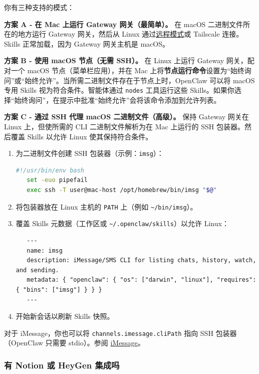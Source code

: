 你有三种支持的模式：

\textbf{方案 A - 在 Mac 上运行 Gateway 网关（最简单）。}
在 macOS 二进制文件所在的地方运行 Gateway 网关，然后从 Linux 通过\href{\#how-do-i-run-openclaw-in-remote-mode-client-connects-to-a-gateway-elsewhere}{远程模式}或 Tailscale 连接。Skills 正常加载，因为 Gateway 网关主机是 macOS。

\textbf{方案 B - 使用 macOS 节点（无需 SSH）。}
在 Linux 上运行 Gateway 网关，配对一个 macOS 节点（菜单栏应用），并在 Mac 上将\textbf{节点运行命令}设置为“始终询问”或“始终允许”。当所需二进制文件存在于节点上时，OpenClaw 可以将 macOS 专用 Skills 视为符合条件。智能体通过 \texttt{nodes} 工具运行这些 Skills。如果你选择“始终询问”，在提示中批准“始终允许”会将该命令添加到允许列表。

\textbf{方案 C - 通过 SSH 代理 macOS 二进制文件（高级）。}
保持 Gateway 网关在 Linux 上，但使所需的 CLI 二进制文件解析为在 Mac 上运行的 SSH 包装器。然后覆盖 Skills 以允许 Linux 使其保持符合条件。

\begin{enumerate}
  \item 为二进制文件创建 SSH 包装器（示例：\texttt{imsg}）：
\begin{lstlisting}[language=bash]
   #!/usr/bin/env bash
   set -euo pipefail
   exec ssh -T user@mac-host /opt/homebrew/bin/imsg "$@"
\end{lstlisting}

  \item 将包装器放在 Linux 主机的 \texttt{PATH} 上（例如 \texttt{\textasciitilde{}/bin/imsg}）。
  \item 覆盖 Skills 元数据（工作区或 \texttt{\textasciitilde{}/.openclaw/skills}）以允许 Linux：
\begin{lstlisting}
   ---
   name: imsg
   description: iMessage/SMS CLI for listing chats, history, watch, and sending.
   metadata: { "openclaw": { "os": ["darwin", "linux"], "requires": { "bins": ["imsg"] } } }
   ---
\end{lstlisting}

  \item 开始新会话以刷新 Skills 快照。
\end{enumerate}


对于 iMessage，你也可以将 \texttt{channels.imessage.cliPath} 指向 SSH 包装器（OpenClaw 只需要 stdio）。参阅 \href{/channels/imessage}{iMessage}。

\subsubsection{有 Notion 或 HeyGen 集成吗}


